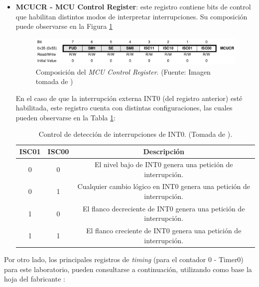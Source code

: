 \begin{itemize}
    \item \textbf{MCUCR - MCU Control Register}: este registro contiene bits de control que habilitan distintos modos de interpretar interrupciones. Su composición puede observarse en la Figura \ref{fig:MCUCR}

    \begin{figure}[H]
    \centering
    \includegraphics[width=150mm]{./Figuras/Nota_teorica/MCUCR}
    \caption{Composición del \textit{MCU Control Register}. (Fuente: Imagen tomada de \cite{AT})}
    \label{fig:MCUCR}
    \end{figure}

    En el caso de que la interrupción externa INT0 (del registro anterior) esté habilitada, este registro cuenta con distintas configuraciones, las cuales pueden observarse en la Tabla \ref{table:MCUCR}: 

    \begin{table}[!ht]
    \caption{Control de detección de interrupciones de INT0. (Tomada de \cite{AT}).}
    \begin{center}
    \begin{tabular}{c|c|c}
    \hline
    \textbf{ISC01}&\textbf{ISC00}&\textbf{Descripción}\\
    \hline
    0 & 0 & El nivel bajo de INT0 genera una petición de interrupción.\\\hline
    0 & 1 & Cualquier cambio lógico en INT0 genera una petición de interrupción.\\\hline
    1 & 0 & El flanco decreciente de INT0 genera una petición de interrupción.\\\hline
    1 & 1 & El flanco creciente de INT0 genera una petición de interrupción.\\
    \hline
    \end{tabular} \label{table:MCUCR}
    \end{center}
    \end{table}
\end{itemize}

Por otro lado, los principales registros de \textit{timing} (para el contador 0 - Timer0) para este laboratorio, pueden consultarse a continuación, utilizando como base la hoja del fabricante \cite{AT}:

